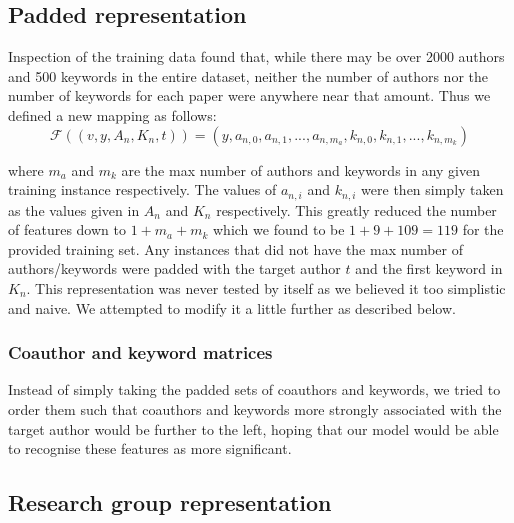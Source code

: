 \documentclass[11pt]{article}
\begin{document}
\subsection{Padded representation}

Inspection of the training data found that, while there may be over 2000 authors and 500 keywords in the entire dataset, neither the number of authors nor the number of keywords for each paper were anywhere near that amount. Thus we defined a new mapping as follows:
\begin{equation*}
	\mathcal{F}((v, y, A_n, K_n, t)) = (y, a_{n,0}, a_{n,1}, ..., a_{n,m_a}, k_{n,0}, k_{n,1}, ..., k_{n,m_k})
\end{equation*}


where $m_a$ and $m_k$ are the max number of authors and keywords in any given training instance respectively. The values of $a_{n,i}$ and $k_{n,i}$ were then simply taken as the values given in $A_n$ and $K_n$ respectively. This greatly reduced the number of features down to $1+m_a+m_k$ which we found to be $1+9+109=119$ for the provided training set. Any instances that did not have the max number of authors/keywords were padded with the target author $t$ and the first keyword in $K_n$. This representation was never tested by itself as we believed it too simplistic and naive. We attempted to modify it a little further as described below.

\subsubsection{Coauthor and keyword matrices}

Instead of simply taking the padded sets of coauthors and keywords, we tried to order them such that coauthors and keywords more strongly associated with the target author would be further to the left, hoping that our model would be able to recognise these features as more significant.


\subsection{Research group representation}




\end{document}
